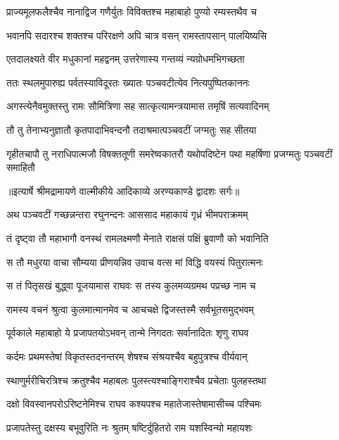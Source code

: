 \twolineshloka
{प्राज्यमूलफलैश्चैव नानाद्विज गणैर्युतः}
{विविक्तश्च महाबाहो पुण्यो रम्यस्तथैव च} %

\twolineshloka
{भवानपि सदारश्च शक्तश्च परिरक्षणे}
{अपि चात्र वसन् रामस्तापसान् पालयिष्यसि} %

\twolineshloka
{एतदालक्ष्यते वीर मधुकानां महद्वनम्}
{उत्तरेणास्य गन्तव्यं न्यग्रोधमभिगच्छता} %

\twolineshloka
{ततः स्थलमुपारुह्य पर्वतस्याविदूरतः}
{ख्यातः पञ्चवटीत्येव नित्यपुष्पितकाननः} %

\twolineshloka
{अगस्त्येनैवमुक्तस्तु रामः सौमित्रिणा सह}
{सात्कृत्यामन्त्रयामास तमृषिं सत्यवादिनम्} %

\twolineshloka
{तौ तु तेनाभ्यनुज्ञातौ कृतपादाभिवन्दनौ}
{तदाश्रमात्पञ्चवटीं जग्मतुः सह सीतया} %

\fourlineindentedshloka
{गृहीतचापौ तु नराधिपात्मजौ}
{विषक्ततूणी समरेष्वकातरौ}
{यथोपदिष्टेन पथा महर्षिणा}
{प्रजग्मतुः पञ्चवटीं समाहितौ} %


{॥इत्यार्षे श्रीमद्रामायणे वाल्मीकीये आदिकाव्ये अरण्यकाण्डे द्वादशः सर्गः॥}


\twolineshloka
{अथ पञ्चवटीं गच्छन्नन्तरा रघुनन्दनः}
{आससाद महाकायं गृध्रं भीमपराक्रमम्} %

\twolineshloka
{तं दृष्ट्वा तौ महाभागौ वनस्थं रामलक्ष्मणौ}
{मेनाते राक्षसं पक्षिं ब्रुवाणौ को भवानिति} %

\twolineshloka
{स तौ मधुरया वाचा सौम्यया प्रीणयन्निव}
{उवाच वत्स मां विद्धि वयस्यं पितुरात्मनः} %

\twolineshloka
{स तं पितृसखं बुद्ध्वा पूजयामास राघवः}
{स तस्य कुलमव्यग्रमथ पप्रच्छ नाम च} %

\twolineshloka
{रामस्य वचनं श्रुत्वा कुलमात्मानमेव च}
{आचचक्षे द्विजस्तस्मै सर्वभूतसमुद्भवम्} %

\twolineshloka
{पूर्वकाले महाबाहो ये प्रजापतयोऽभवन्}
{तान्मे निगदतः सर्वानादितः शृणु राघव} %

\twolineshloka
{कर्दमः प्रथमस्तेषां विकृतस्तदनन्तरम्}
{शेषश्च संश्रयश्चैव बहुपुत्रश्च वीर्यवान्} %

\twolineshloka
{स्थाणुर्मरीचिरत्रिश्च क्रतुश्चैव महाबलः}
{पुलस्त्यश्चाङ्गिराश्चैव प्रचेताः पुलहस्तथा} %

\twolineshloka
{दक्षो विवस्वानपरोऽरिष्टनेमिश्च राघव}
{कश्यपश्च महातेजास्तेषामासीच्च पश्चिमः} %

\twolineshloka
{प्रजापतेस्तु दक्षस्य बभूवुरिति नः श्रुतम्}
{षष्टिर्दुहितरो राम यशस्विन्यो महायशः} %

